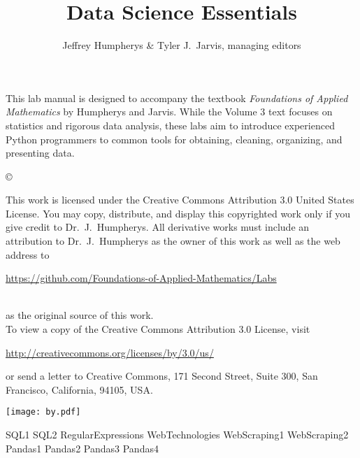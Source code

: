 \documentclass[opener-c,labs,grey,nociteref]{HJnewsiambook}
\title{Data Science Essentials}
\author{Jeffrey Humpherys \& Tyler J.~Jarvis, managing editors}
\begin{document}

\thispagestyle{empty} %
\maketitle
\thispagestyle{empty}
\frontmatter



\begin{thepreface} %

This lab manual is designed to accompany the textbook \emph{Foundations of Applied Mathematics} by Humpherys and Jarvis.
While the Volume 3 text focuses on statistics and rigorous data analysis, these labs aim to introduce experienced Python programmers to common tools for obtaining, cleaning, organizing, and presenting data.

\vfill
\copyright{This work is licensed under the Creative Commons Attribution 3.0 United States License.
You may copy, distribute, and display this copyrighted work only if you give credit to Dr.~J.~Humpherys.
All derivative works must include an attribution to Dr.~J.~Humpherys as the owner of this work as well as the web address to
\\\centerline{\url{https://github.com/Foundations-of-Applied-Mathematics/Labs}}\\as the original source of this work.
\\To view a copy of the Creative Commons Attribution 3.0 License, visit
\\\centerline{\url{http://creativecommons.org/licenses/by/3.0/us/}} or send a letter to Creative Commons, 171 Second Street, Suite 300, San Francisco, California, 94105, USA.}

\vfill
\centering\texttt{[image: by.pdf]}
\vfill
\end{thepreface}

\setcounter{tocdepth}{1}
\tableofcontents

\mainmatter %

{SQL1}
{SQL2}
{RegularExpressions}
{WebTechnologies}
{WebScraping1}
{WebScraping2}
{Pandas1}
{Pandas2}
{Pandas3}
{Pandas4}

% 
% 
\end{document}
